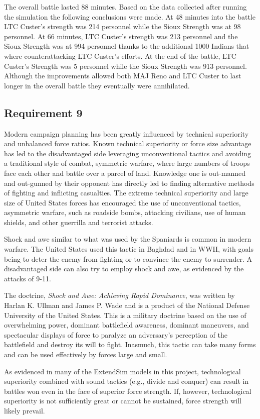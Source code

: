 \documentclass[letterpaper,10pt]{article}
\begin{document}
The overall battle lasted 88 minutes. Based on the data collected after running the simulation the following conclusions were made. At 48 minutes into the battle LTC Custer’s strength was 214 personnel while the Sioux Strength was at 98 personnel.  At 66 minutes, LTC Custer’s strength was 213 personnel and the Sioux Strength was at 994 personnel thanks to the additional 1000 Indians that where counterattacking LTC Custer’s efforts. At the end of the battle, LTC Custer’s Strength was 5 personnel while the Sioux Strength was 913 personnel. Although the improvements allowed both MAJ Reno and LTC Custer to last longer in the overall battle they eventually were annihilated.

\subsection{Requirement 9}
Modern campaign planning has been greatly influenced by technical superiority and unbalanced force ratios.  Known technical superiority or force size advantage has led to the disadvantaged side leveraging unconventional tactics and avoiding a traditional style of combat, symmetric warfare, where large numbers of troops face each other and battle over a parcel of land.  Knowledge one is out-manned and out-gunned by their opponent has directly led to finding alternative methods of fighting and inflicting casualties.  The extreme technical superiority and large size of United States forces has encouraged the use of unconventional tactics, asymmetric warfare, such as roadside bombs, attacking civilians, use of human shields, and other guerrilla and terrorist attacks.

Shock and awe similar to what was used by the Spaniards is common in modern warfare. The United States used this tactic in Baghdad and in WWII, with goals being to deter the enemy from fighting or to convince the enemy to surrender.  A disadvantaged side can also try to employ shock and awe, as evidenced by the attacks of 9-11.

The doctrine, \emph{Shock and Awe: Achieving Rapid Dominance}, was written by Harlan K. Ullman and James P. Wade and is a product of the National Defense University of the United States. This is a military doctrine based on the use of overwhelming power, dominant battlefield awareness, dominant maneuvers, and spectacular displays of force to paralyze an adversary's perception of the battlefield and destroy its will to fight.  Inasmuch, this tactic can take many forms and can be used effectively by forces large and small.

As evidenced in many of the ExtendSim models in this project, technological superiority combined with sound tactics (e.g., divide and conquer) can result in battles won even in the face of superior force strength.  If, however, technological superiority is not sufficiently great or cannot be sustained, force strength will likely prevail.
\end{document}

